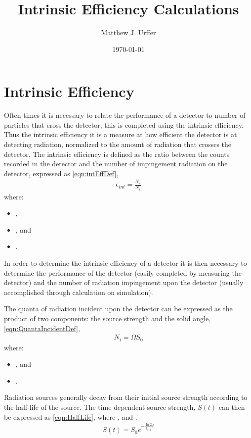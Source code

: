 \documentclass[draftcls,onecolumn]{IEEEtran}
\begin{document}
\title{Intrinsic Efficiency Calculations}
\author{Matthew J. Urffer}
\date{\today}
\maketitle

\printnomenclature
\printindex

\listoftodos
\tableofcontents
\listoffigures
\listoftables
\lstlistoflistings
\section{Intrinsic Efficiency}
Often times it is necessary to relate the performance of a detector to number of particles that cross the detector, this is completed using the intrinsic efficiency.
Thus the intrinsic efficiency it is a measure at how efficient the detector is at detecting radiation, normalized to the amount of radiation that crosses the detector.
The intrinsic efficiency is defined as the ratio between the counts recorded in the detector and the number of impingement radiation on the detector\cite{knoll_radiation_2009}, expressed as \eqref{eqn:intEffDef},
\begin{align}
  \label{eqn:intEffDef}
  \epsilon_{int} = \frac{N_c}{N_i}
\end{align}
where:
\begin{itemize}
  \item[] ,
  \item[] , and
  \item[] .
\end{itemize}
In order to determine the intrinsic efficiency of a detector it is then necessary to determine the performance of the detector (easily completed by measuring the detector) and the number of radiation impingement upon the detector (usually accomplished through calculation on simulation).

The quanta of radiation incident upon the detector can be expressed as the product of two components: the source strength and the solid angle, \eqref{eqn:QuantaIncidentDef},
\begin{align}
  \label{eqn:QuantaIncidentDef}
  N_i = \Omega S_0
\end{align}
where:
\begin{itemize}
  \item[] , and 
  \item[] .
\end{itemize}
Radiation sources generally decay from their initial source strength according to the half-life of the source.
The time dependent source strength, $S(t)$ can then be expressed as \eqref{eqn:HalfLife}, where ,  and .
\begin{align}
  \label{eqn:HalfLife}
  S(t) = S_0 e^{-\frac{\ln{2}}{t_{1/2}} t}
\end{align}
\end{document}
